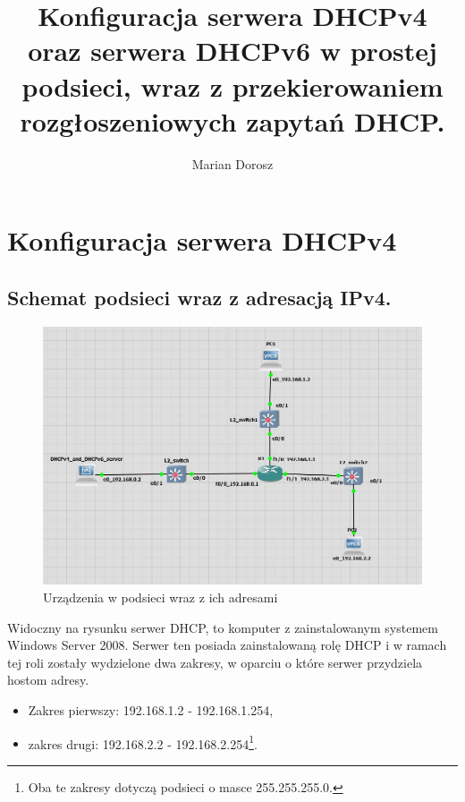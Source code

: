 \documentclass[12pt, a4paper]{article}
\title{Konfiguracja serwera DHCPv4 oraz serwera DHCPv6 w prostej podsieci, wraz z przekierowaniem rozgłoszeniowych zapytań DHCP.}
\author{Marian Dorosz}
\date{}
\begin{document}
\maketitle
\newpage

\tableofcontents
\newpage

\listoffigures
\newpage

\section{Konfiguracja serwera DHCPv4}
    \subsection{Schemat podsieci wraz z adresacją IPv4.}
        \begin{figure}[!h]
            \centering
            \includegraphics[scale = 0.456]{podsiec_dhcpv4.JPG}
            \caption{Urządzenia w podsieci wraz z ich adresami}
            \label{fig:dhcpv4}
        \end{figure}
        Widoczny na rysunku serwer DHCP, to komputer z zainstalowanym systemem Windows Server 2008. Serwer ten posiada zainstalowaną rolę DHCP i w ramach tej roli zostały wydzielone dwa zakresy, w oparciu o które serwer przydziela hostom adresy.
        \begin{itemize}
            \item Zakres pierwszy: 192.168.1.2 - 192.168.1.254,
            \item zakres drugi: 192.168.2.2 - 192.168.2.254\footnote{Oba te zakresy dotyczą podsieci o masce 255.255.255.0.}.
        \end{itemize}
\end{document}
